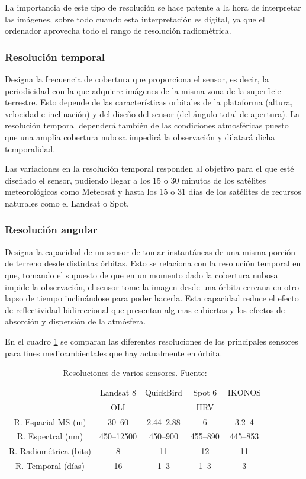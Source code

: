 La importancia de este tipo de resolución se hace patente a la hora de interpretar las imágenes, sobre todo cuando esta interpretación es digital, ya que el ordenador aprovecha todo el rango de resolución radiométrica.

\subsubsection{Resolución temporal}
Designa la frecuencia de cobertura que proporciona el sensor, es decir, la periodicidad con la que adquiere imágenes de la misma zona de la superficie terrestre. Esto depende de las características orbitales de la plataforma (altura, velocidad e inclinación) y del diseño del sensor (del ángulo total de apertura). La resolución temporal dependerá también de las condiciones atmosféricas puesto que una amplia cobertura nubosa impedirá la observación y dilatará dicha temporalidad.%

Las variaciones en la resolución temporal responden al objetivo para el que esté diseñado el sensor, pudiendo llegar a los 15 o 30 minutos de los satélites meteorológicos como Meteosat y hasta los 15 o 31 días de los satélites de recursos naturales como el Landsat o Spot.

\subsubsection{Resolución angular}
Designa la capacidad de un sensor de tomar instantáneas de una misma porción de terreno desde distintas órbitas. Esto se relaciona con la resolución temporal en que, tomando el supuesto de que en un momento dado la cobertura nubosa impide la observación, el sensor tome la imagen desde una órbita cercana en otro lapso de tiempo inclinándose para poder hacerla. Esta capacidad reduce el efecto de reflectividad bidireccional que presentan algunas cubiertas y los efectos de absorción y dispersión de la atmósfera.%

En el cuadro \ref{tab:resoluciones} se comparan las diferentes resoluciones de los principales sensores para fines medioambientales que hay actualmente en órbita.

\begin{table}[ht]
	\centering
	\begin{tabular}{@{}ccccc@{}}
	\toprule[0.4mm]
	& Landsat 8 & QuickBird & Spot 6 & IKONOS \\
	& OLI & & HRV & \\
	\midrule
	R. Espacial MS (m) & 30--60 & 2.44--2.88 & 6 & 3.2--4 \\
	R. Espectral (nm) & 450--12500 & 450--900 & 455--890 & 445--853 \\
	R. Radiométrica (bits) & 8 & 11 & 12 & 11 \\
	R. Temporal (días) & 16 & 1--3 & 1--3 & 3 \\
	\bottomrule[0.4mm]
	\end{tabular}
	\caption[Resoluciones de varios sensores]{Resoluciones de varios sensores. Fuente: \cite{labrador2012satelites}}
	\label{tab:resoluciones}
\end{table}

